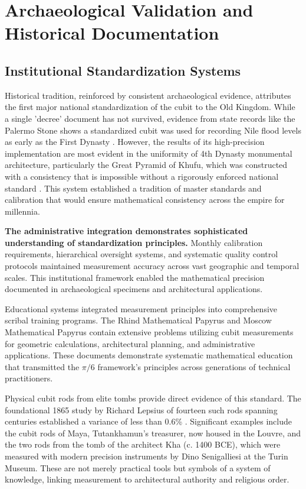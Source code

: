 \documentclass[11pt]{article}
\begin{document}
\section{Archaeological Validation and Historical Documentation}

\subsection{Institutional Standardization Systems}

Historical tradition, reinforced by consistent archaeological evidence, attributes the first major national standardization of the cubit to the Old Kingdom. While a single 'decree' document has not survived, evidence from state records like the Palermo Stone shows a standardized cubit was used for recording Nile flood levels as early as the First Dynasty \cite{clagett1995ancient}. However, the results of its high-precision implementation are most evident in the uniformity of 4th Dynasty monumental architecture, particularly the Great Pyramid of Khufu, which was constructed with a consistency that is impossible without a rigorously enforced national standard \cite{rossi2004architecture, edwards1972pyramids}. This system established a tradition of master standards and calibration that would ensure mathematical consistency across the empire for millennia.

\textbf{The administrative integration demonstrates sophisticated understanding of standardization principles.} Monthly calibration requirements, hierarchical oversight systems, and systematic quality control protocols maintained measurement accuracy across vast geographic and temporal scales. This institutional framework enabled the mathematical precision documented in archaeological specimens and architectural applications.

Educational systems integrated measurement principles into comprehensive scribal training programs. The Rhind Mathematical Papyrus and Moscow Mathematical Papyrus contain extensive problems utilizing cubit measurements for geometric calculations, architectural planning, and administrative applications. These documents demonstrate systematic mathematical education that transmitted the $\pi/6$ framework's principles across generations of technical practitioners.

Physical cubit rods from elite tombs provide direct evidence of this standard. The foundational 1865 study by Richard Lepsius of fourteen such rods spanning centuries established a variance of less than 0.6\% \cite{lepsius1865altagyptische}. Significant examples include the cubit rods of Maya, Tutankhamun's treasurer, now housed in the Louvre, and the two rods from the tomb of the architect Kha (c. 1400 BCE), which were measured with modern precision instruments by Dino Senigalliesi at the Turin Museum. These are not merely practical tools but symbols of a system of knowledge, linking measurement to architectural authority and religious order.
\end{document}
